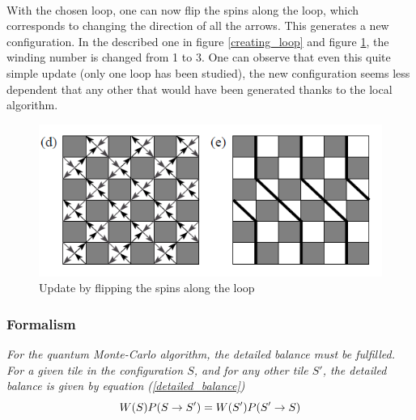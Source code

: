 \documentclass[a4paper,12pt]{article}
\begin{document}
	\paragraph{}
	With the chosen loop, one can now flip the spins along the loop, which corresponds to changing the direction of all the arrows. This generates a new configuration. In the described one in figure \ref{creating_loop} and figure \ref{loop_update}, the winding number is changed from 1 to 3. One can observe that even this quite simple update (only one loop has been studied), the new configuration seems less dependent that any other that would have been generated thanks to the local algorithm. 
	\begin{figure}[H]
		\centering
		\includegraphics[]{loop_update.png}
		\caption{Update by flipping the spins along the loop}
		\label{loop_update}
	\end{figure}

	\subsubsection{Formalism}
	\emph{For the quantum Monte-Carlo algorithm, the detailed balance must be fulfilled. For a given tile in the configuration $S$, and for any other tile $S'$, the detailed balance is given by equation (\ref{detailed_balance})}
	\begin{equation}
		\centering
		W(S)P(S\rightarrow S') = W(S')P(S'\rightarrow S)
		\label{detailed_balance}
	\end{equation}
	
\end{document}
